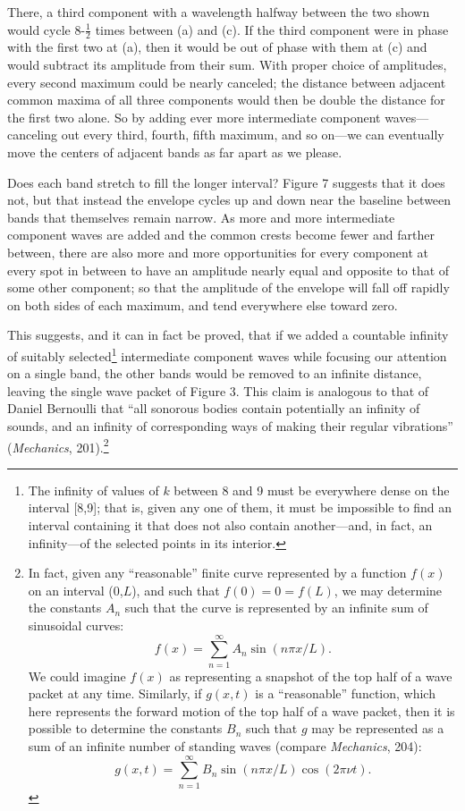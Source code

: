 There, a third component with a wavelength halfway between the two shown
would cycle 8-$\frac{1}{2}$ times between (a) and (c). If the third component were in
phase with the first two at (a), then it would be out of phase with them
at (c) and would subtract its amplitude from their sum. With proper
choice of amplitudes, every second maximum could be nearly canceled; the
distance between adjacent common maxima of all three components would
then be double the distance for the first two alone. So by adding ever
more intermediate component waves---canceling out every third, fourth,
fifth maximum, and so on---we can eventually move the centers of
adjacent bands as far apart as we please.

Does each band stretch to fill the longer interval? Figure 7 suggests
that it does not, but that instead the envelope cycles up and down near
the baseline between bands that themselves remain narrow. As more and
more intermediate component waves are added and the common crests become
fewer and farther between, there are also more and more opportunities
for every component at every spot in between to have an amplitude nearly
equal and opposite to that of some other component; so that the
amplitude of the envelope will fall off rapidly on both sides of each
maximum, and tend everywhere else toward zero.

This suggests, and it can in fact be proved, that if we added a
countable infinity of suitably selected\footnote{The infinity of values
  of $k$ between 8 and 9 must be everywhere dense on the interval
  {[}8,9{]}; that is, given any one of them, it must be impossible to
  find an interval containing it that does not also contain
  another---and, in fact, an infinity---of the selected points in its
  interior.} intermediate component waves while focusing our attention
on a single band, the other bands would be removed to an infinite
distance, leaving the single wave packet of Figure 3. This claim is
analogous to that of Daniel Bernoulli that ``all sonorous bodies contain
potentially an infinity of sounds, and an infinity of corresponding ways
of making their regular vibrations'' (\emph{Mechanics}, 201).\footnote{In
  fact, given any ``reasonable'' finite curve represented by a function
  $f(x)$ on an interval (0,$L$), and such that $f(0) = 0
  = f(L)$, we may determine the constants
  $A_n$ such that the curve is represented by an
  infinite sum of sinusoidal curves: 
  \begin{equation*}
  f(x) = \sum_{n=1}^{\infty}A_n \sin (n\pi x/L). 
  \end{equation*}
  We could
  imagine $f(x)$ as representing a snapshot of the top half
  of a wave packet at any time. Similarly, if $g(x,t)$ is a
  ``reasonable'' function, which here represents the forward motion of
  the top half of a wave packet, then it is possible to determine the
  constants $B_n$ such that $g$ may be
  represented as a sum of an infinite number of standing waves (compare
  \emph{Mechanics}, 204):
  \begin{equation*}
  g(x,t) = \sum_{n=1}^{\infty} B_n \sin (n\pi x/L) \cos (2\pi\nu t).
  \end{equation*}
  }

